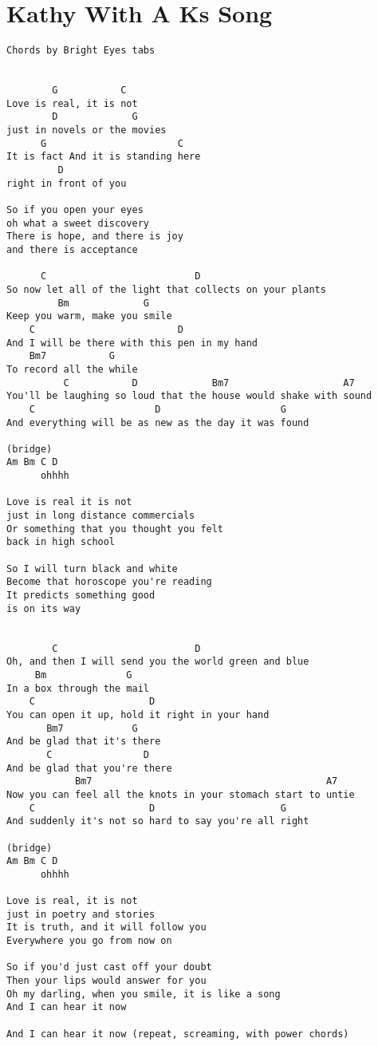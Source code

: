 \documentclass[leqno]{memoir}
\begin{document}
\chapter{Kathy With A Ks Song }
\begin{verbatim}
Chords by Bright Eyes tabs


        G           C
Love is real, it is not
        D             G
just in novels or the movies
      G                       C
It is fact And it is standing here
         D
right in front of you

So if you open your eyes
oh what a sweet discovery
There is hope, and there is joy
and there is acceptance

      C                          D
So now let all of the light that collects on your plants
         Bm             G
Keep you warm, make you smile
    C                         D
And I will be there with this pen in my hand
    Bm7           G
To record all the while
          C           D             Bm7                    A7
You'll be laughing so loud that the house would shake with sound
    C                     D                     G
And everything will be as new as the day it was found

(bridge)
Am Bm C D
      ohhhh

Love is real it is not
just in long distance commercials
Or something that you thought you felt
back in high school

So I will turn black and white
Become that horoscope you're reading
It predicts something good
is on its way


        C                        D
Oh, and then I will send you the world green and blue
     Bm              G
In a box through the mail
    C                    D
You can open it up, hold it right in your hand
       Bm7            G
And be glad that it's there
       C                D
And be glad that you're there
            Bm7                                         A7
Now you can feel all the knots in your stomach start to untie
    C                    D                      G
And suddenly it's not so hard to say you're all right

(bridge)
Am Bm C D
      ohhhh

Love is real, it is not
just in poetry and stories
It is truth, and it will follow you
Everywhere you go from now on

So if you'd just cast off your doubt
Then your lips would answer for you
Oh my darling, when you smile, it is like a song
And I can hear it now

And I can hear it now (repeat, screaming, with power chords)

\end{verbatim}
\newpage
\end{document}
